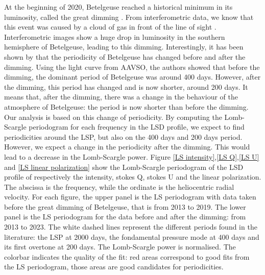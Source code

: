 \documentclass{aa}
\begin{document}
At the beginning of 2020, Betelgeuse reached a historical minimum in its luminosity, called the great dimming \citep{Guinan2020}. 
From interferometric data, we know that this event was caused by a cloud of gas in front of the line of sight \citep{Montargès2021}. 
Interferometric images show a huge drop in luminosity in the southern hemisphere of Betelgeuse, leading to this dimming. Interestingly, 
it has been shown by \cite{jadlovsky2022} that the periodicity of Betelgeuse has changed before and after the dimming. Using the light curve from AAVSO, 
the authors showed that before the dimming, the dominant period of Betelgeuse was around 400 days. However, after the dimming, this period has changed and 
is now shorter, around 200 days. It means that, after the dimming, there was a change in the behaviour of the atmosphere of Betelgeuse: the period is now
shorter than before the dimming. Our analysis is based on this change of periodicity. By computing the Lomb-Scargle periodogram for each frequency 
in the LSD profile, we expect to find periodicities around the LSP, but also on the 400 days and 200 days period. However, we expect a change
in the periodicity after the dimming. This would lead to a decrease in the Lomb-Scargle power. 
Figure \ref{LS intensity},\ref{LS Q},\ref{LS U} and \ref{LS linear polarization} show the Lomb-Scargle periodogram of the LSD profile of respectively 
the intensity, stokes Q, stokes U and the linear polarization. The abscissa is the frequency, while the ordinate is the heliocentric radial velocity. 
For each figure, the upper panel is the LS periodogram with data taken before the great dimming of Betelgeuse, that is from 2013 to 2019. 
The lower panel is the LS periodogram for the data before and after the dimming: from 2013 to 2023. The white dashed lines represent the different 
periods found in the literature: the LSP at 2000 days, the fondamental pressure mode at 400 days and its first overtone at 200 days. The Lomb-Scargle 
power is normalised. The colorbar indicates the quality of the fit: red areas correspond to good fits from the LS periodogram, those areas are good 
candidates for periodicities. 
\end{document}
